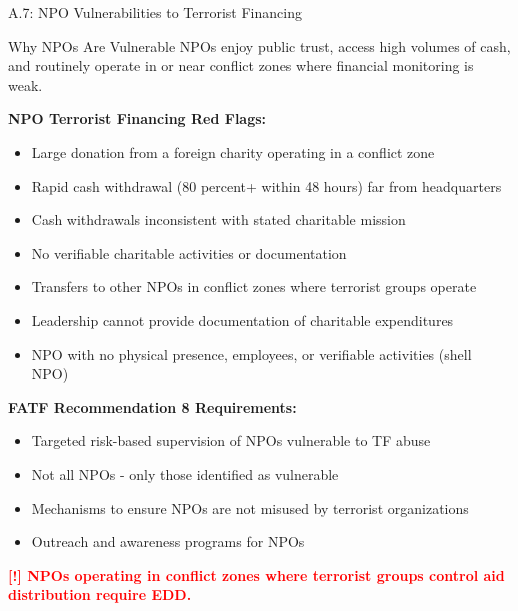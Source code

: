 \documentclass[11pt,a4paper]{beamer}
\newcommand{\redflag}[1]{\textcolor{red}{\textbf{[!] #1}}}
\begin{document}
	\begin{frame}{A.7: NPO Vulnerabilities to Terrorist Financing}
		\begin{block}{Why NPOs Are Vulnerable}
			NPOs enjoy public trust, access high volumes of cash, and routinely operate in or near conflict zones where financial monitoring is weak.
		\end{block}
		\textbf{NPO Terrorist Financing Red Flags:}
		\begin{itemize}
			\item Large donation from a foreign charity operating in a conflict zone
			\item Rapid cash withdrawal (80 percent+ within 48 hours) far from headquarters
			\item Cash withdrawals inconsistent with stated charitable mission
			\item No verifiable charitable activities or documentation
			\item Transfers to other NPOs in conflict zones where terrorist groups operate
			\item Leadership cannot provide documentation of charitable expenditures
			\item NPO with no physical presence, employees, or verifiable activities (shell NPO)
		\end{itemize}
		\textbf{FATF Recommendation 8 Requirements:}
		\begin{itemize}
			\item Targeted risk-based supervision of NPOs vulnerable to TF abuse
			\item Not all NPOs - only those identified as vulnerable
			\item Mechanisms to ensure NPOs are not misused by terrorist organizations
			\item Outreach and awareness programs for NPOs
		\end{itemize}
		\redflag{NPOs operating in conflict zones where terrorist groups control aid distribution require EDD.}
	\end{frame}
	
\end{document}

